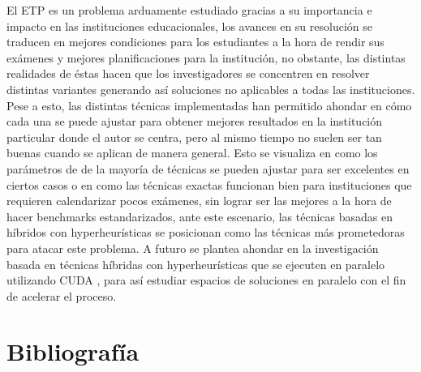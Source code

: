 \documentclass[letter, 10pt]{article}
\begin{document}
El ETP es un problema arduamente estudiado gracias a su importancia e impacto en las instituciones educacionales, los avances en su resolución se traducen en mejores condiciones para los estudiantes a la hora de rendir sus exámenes y mejores planificaciones para la institución, no obstante, las distintas realidades de éstas hacen que los investigadores se concentren en resolver distintas variantes generando así soluciones no aplicables a todas las instituciones. Pese a esto, las distintas técnicas implementadas han permitido ahondar en cómo cada una se puede ajustar para obtener mejores resultados en la institución particular donde el autor se centra, pero al mismo tiempo no suelen ser tan buenas cuando se aplican de manera general. Esto se visualiza en como los parámetros de de la mayoría de técnicas se pueden ajustar para ser excelentes en ciertos casos o en como las técnicas exactas funcionan bien para instituciones que requieren calendarizar pocos exámenes, sin lograr ser las mejores a la hora de hacer benchmarks estandarizados, ante este escenario, las técnicas basadas en híbridos con hyperheurísticas se posicionan como las técnicas más prometedoras para atacar este problema. A futuro se plantea ahondar en la investigación basada en técnicas híbridas con hyperheurísticas que se ejecuten en paralelo utilizando CUDA \cite{cuda}, para así estudiar espacios de soluciones en paralelo con el fin de acelerar el proceso.


\section*{Bibliografía}


\end{document}
